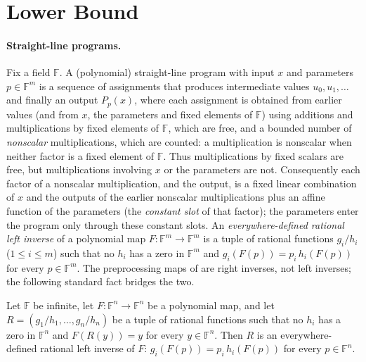 
\section{Lower Bound}
\label{sec:lower}

\paragraph{Straight-line programs.}
Fix a field $\mathbb{F}$.
A (polynomial) straight-line program with input $x$ and parameters $p\in\mathbb{F}^m$ is a sequence of assignments that produces intermediate values $u_0,u_1,\dots$ and finally an output $P_p(x)$, where each assignment is obtained from earlier values (and from $x$, the parameters and fixed elements of $\mathbb{F}$) using additions and multiplications by fixed elements of $\mathbb{F}$, which are free, and a bounded number of \emph{nonscalar} multiplications, which are counted: a multiplication is nonscalar when neither factor is a fixed element of $\mathbb{F}$.
Thus multiplications by fixed scalars are free, but multiplications involving $x$ or the parameters are not.
Consequently each factor of a nonscalar multiplication, and the output, is a fixed linear combination of $x$ and the outputs of the earlier nonscalar multiplications plus an affine function of the parameters (the \emph{constant slot} of that factor); the parameters enter the program only through these constant slots.
An \emph{everywhere-defined rational left inverse} of a polynomial map $F\colon\mathbb{F}^m\to\mathbb{F}^m$ is a tuple of rational functions $g_i/h_i$ ($1\le i\le m$) such that no $h_i$ has a zero in $\mathbb{F}^m$ and $g_i(F(p))=p_i\,h_i(F(p))$ for every $p\in\mathbb{F}^m$.
The preprocessing maps of  are right inverses, not left inverses; the following standard fact bridges the two.

\begin{lemma}
\label{lem:right-left}
Let $\mathbb{F}$ be infinite, let $F\colon\mathbb{F}^n\to\mathbb{F}^n$ be a polynomial map, and let $R=(g_1/h_1,\dots,g_n/h_n)$ be a tuple of rational functions such that no $h_i$ has a zero in $\mathbb{F}^n$ and $F(R(y))=y$ for every $y\in\mathbb{F}^n$.
Then $R$ is an everywhere-defined rational left inverse of $F$: $g_i(F(p))=p_i\,h_i(F(p))$ for every $p\in\mathbb{F}^n$.
\end{lemma}

